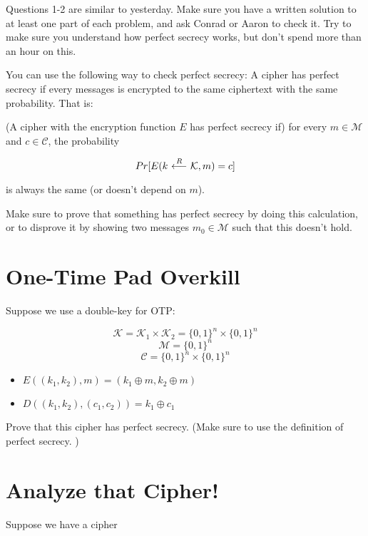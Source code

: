 \documentclass[12pt]{article}
\begin{document}
Questions 1-2 are similar to yesterday. Make sure you have a written solution to at least one part of each problem, and ask Conrad or Aaron to check it. Try to make sure you understand how perfect secrecy works, but don't spend more than an hour on this.

You can use the following way to check perfect secrecy: A cipher has perfect secrecy if every messages is encrypted to the same ciphertext with the same probability. That is:


{ (A cipher with the encryption function $E$ has perfect secrecy if) for every $m \in \mathcal{M}$ and $c \in \mathcal{C}$, the probability

$$
Pr[E(k {\ \overset{R}\longleftarrow\ } \mathcal{K}, m) = c]
$$

is always the same (or doesn't depend on $m$).
}

Make sure to prove that something has perfect secrecy by doing this calculation, or to disprove it by showing two messages $m_0 \in \mathcal{M}$ such that this doesn't hold.

\section{One-Time Pad Overkill}

Suppose we use a double-key for OTP:

$$\mathcal{K} = \mathcal{K}_1 \times \mathcal{K}_2 = \{0, 1\}^n \times \{0, 1\}^n$$
$$\mathcal{M} = \{0, 1\}^n$$
$$\mathcal{C} = \{0, 1\}^n \times \{0, 1\}^n$$

\begin{itemize}
\item $E((k_1, k_2), m)  = (k_1 \oplus m, k_2 \oplus m)$
\item $D((k_1, k_2), (c_1, c_2))  = k_1 \oplus c_1$
\end{itemize}

Prove that this cipher has perfect secrecy. (Make sure to use the definition of perfect secrecy.
)



\section{Analyze that Cipher!\texttrademark}
Suppose we have a cipher
\end{document}

